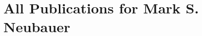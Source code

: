 \documentclass{arcpubs}
\begin{document}
\section*{All Publications for Mark S. Neubauer}

\nocite{*}
\showarticles
\newpage
\showproceedings
\newpage
\showpreprints
\end{document}
